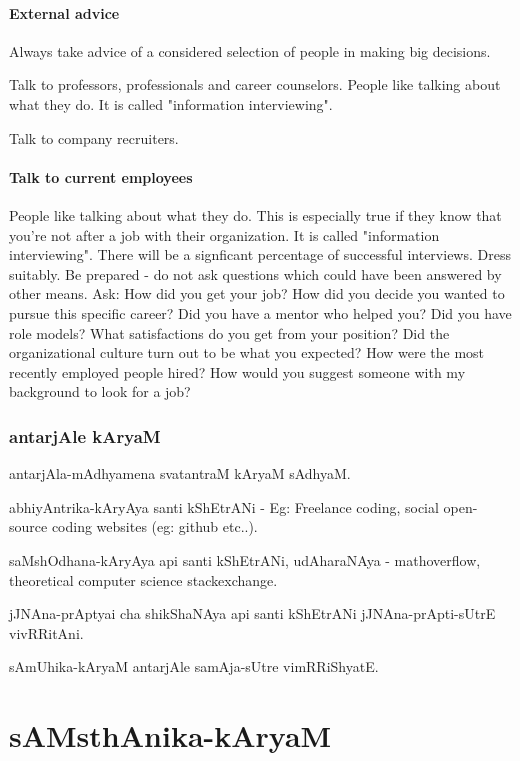 \documentclass[oneside, article]{memoir}
\begin{document}
\subsection{External advice}
Always take advice of a considered selection of people in making big decisions.

\subitem Talk to professors, professionals and career counselors. People like talking about what they do. It is called "information interviewing".

\subitem Talk to company recruiters.

\subsection{Talk to current employees}
People like talking about what they do. This is especially true if they know that you're not after a job with their organization. It is called "information interviewing". There will be a signficant percentage of successful interviews.
\subitem Dress suitably.
\subitem Be prepared - do not ask questions which could have been answered by other means. Ask:
\subsubitem How did you get your job?
\subsubitem How did you decide you wanted to pursue this specific career?
\subsubitem Did you have a mentor who helped you? Did you have role models?
\subsubitem What satisfactions do you get from your position?
\subsubitem Did the organizational culture turn out to be what you expected?
\subsubitem How were the most recently employed people hired?
\subsubitem How would you suggest someone with my background to look for a job?

\section{antarjAle kAryaM}
antarjAla-mAdhyamena svatantraM kAryaM sAdhyaM. 

abhiyAntrika-kAryAya santi kShEtrANi - Eg: Freelance coding, social open-source coding websites (eg: github etc..).

saMshOdhana-kAryAya api santi kShEtrANi, udAharaNAya - mathoverflow, theoretical computer science stackexchange.

jJNAna-prAptyai cha shikShaNAya api santi kShEtrANi jJNAna-prApti-sUtrE vivRRitAni.

sAmUhika-kAryaM antarjAle samAja-sUtre vimRRiShyatE.

\part{sAMsthAnika-kAryaM}
\end{document}
